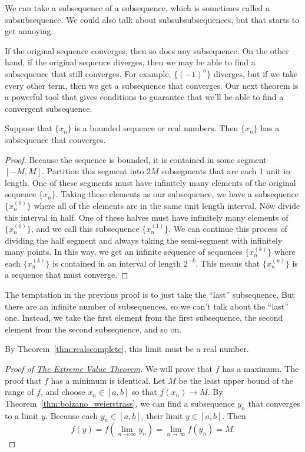 We can take a subsequence of a subsequence, which is sometimes called a subsubsequence.  We could also talk about subsubsubsequences, but that starts to get annoying.

If the original sequence converges, then so does any subsequence.  On the other hand, if the original sequence diverges, then we may be able to find a subsequence that still converges.  For example, $\{(-1)^n\}$ diverges, but if we take every other term, then we get a subsequence that converges.  Our next theorem is a powerful tool that gives conditions to guarantee that we'll be able to find a convergent subsequence.

{Suppose that $\{x_n\}$ is a bounded sequence or real numbers.  Then $\{x_n\}$ has a subsequence that converges.}

\begin{proof}
Because the sequence is bounded, it is contained in some segment $[-M,M]$.
Partition this segment into $2M$ subsegments that are each 1 unit in length.  One of these segments must have infinitely many elements of the original sequence $\{x_n\}$.  Taking these elements as our subsequence, we have a subsequence $\{x_n^{(0)}\}$ where all of the elements are in the same unit length interval.  Now divide this interval in half.  One of these halves must have infinitely many elements of $\{x_n^{(0)}\}$, and we call this subsequence $\{x_n^{(1)}\}$.  We can continue this process of dividing the half segment and always taking the semi-segment with infinitely many points.  In this way, we get an infinite sequence of sequences $\{x_n^{(k)}\}$ where each $\{x_n^{(k)}\}$ is contained in an interval of length $2^{-k}$.  This means that $\{x_n^{(n)}\}$ is a sequence that must converge.
\end{proof}

The temptation in the previous proof is to just take the ``last'' subsequence.  But there are an infinite number of subsequences, so we can't talk about the ``last'' one.  Instead, we take the first element from the first subsequence, the second element from the second subsequence, and so on.

By Theorem~\ref{thm:realscomplete}, this limit must be a real number.

\begin{proof}[Proof of {\hyperref[thm:extreme_val]{The Extreme Value Theorem}}]
\label{pf:extreme_val}
We will prove that $f$ has a maximum.  The proof that $f$ has a minimum is identical.  Let $M$ be the least upper bound of the range of $f$, and choose $x_n\in[a,b]$ so that $f(x_n)\to M$.  By Theorem~\ref{thm:bolzano_weierstrass}, we can find a subsequence $y_n$ that converges to a limit $y$.  Because each $y_n\in[a,b]$, their limit $y\in[a,b]$.  Then
\[
 f(y)=f(\lim_{n\to\infty}y_n)=\lim_{n\to\infty} f(y_n)=M.
\]
\end{proof}

